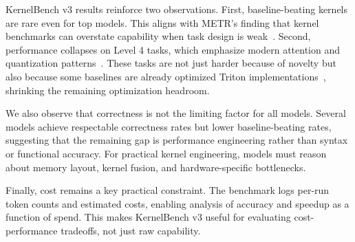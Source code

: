 KernelBench v3 results reinforce two observations. First, baseline-beating kernels are rare even for top models. This aligns with METR's finding that kernel benchmarks can overstate capability when task design is weak~\cite{metr2025}. Second, performance collapses on Level 4 tasks, which emphasize modern attention and quantization patterns~\cite{fp8-formats,int4-quant}. These tasks are not just harder because of novelty but also because some baselines are already optimized Triton implementations~\cite{triton}, shrinking the remaining optimization headroom.

We also observe that correctness is not the limiting factor for all models. Several models achieve respectable correctness rates but lower baseline-beating rates, suggesting that the remaining gap is performance engineering rather than syntax or functional accuracy. For practical kernel engineering, models must reason about memory layout, kernel fusion, and hardware-specific bottlenecks.

Finally, cost remains a key practical constraint. The benchmark logs per-run token counts and estimated costs, enabling analysis of accuracy and speedup as a function of spend. This makes KernelBench v3 useful for evaluating cost-performance tradeoffs, not just raw capability.
